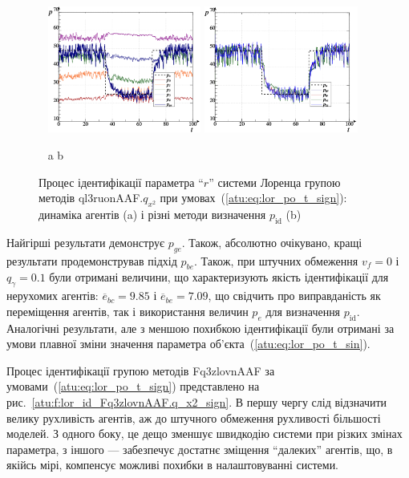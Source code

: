 \documentclass[a4paper,13pt]{atuaref}
\begin{document}
\begin{figure}[ht!]
  \centerline{
    ~ \hfill
    \includegraphics[width=0.45\textwidth]{p5/p/cha/lor/ql3ruonAAF/lor_ql3ruonAAF_qy2-p_t_pi_sign_xl.png}
    \hfill
    \includegraphics[width=0.45\textwidth]{p5/p/cha/lor/ql3ruonAAF/lor_ql3ruonAAF_qy2-p_t_pz_sign_xl.png}
    \hfill ~
  }
  \vspace{-1.5ex}
  \begin{center}
    ~ \hfill a \hfill\hfill b  \hfill ~
  \end{center}
  \vspace{-2.5ex}
  \caption{Процес ідентифікації параметра ``$r$'' системи Лоренца групою методів ql3ruonAAF.$q_{x^2}$ при умовах~(\ref{atu:eq:lor_po_t_sign}):
  динаміка агентів (a) і різні методи визначення $p_\mathrm{id}$ (b)}
  \label{atu:f:lor_id_ql3ruonAAF.q_x2_sign}
\end{figure}

Найгірші результати демонструє $p_{ge}$. Також, абсолютно очікувано, кращі
результати продемонстрував підхід $ p_{be}$. Також, при штучних обмеження
$v_f = 0$ і $q_\gamma = 0.1$ були отримані величини, що характеризують
якість ідентифікації для нерухомих агентів:
$\overline{e}_{bc} = 9.85$ і
$\overline{e}_{be} = 7.09$, що свідчить про виправданість як переміщення
агентів, так і використання величин $p_e$ для визначення $p_\mathrm{id}$.
Аналогічні результати, але з меншою похибкою ідентифікації були отримані за
умови плавної зміни значення параметра об'єкта~(\ref{atu:eq:lor_po_t_sin}).

Процес ідентифікації групою методів Fq3zlovnAAF за умовами~(\ref{atu:eq:lor_po_t_sign}) представлено
на рис.~\ref{atu:f:lor_id_Fq3zlovnAAF.q_x2_sign}. В першу чергу слід
відзначити велику рухливість агентів, аж до штучного обмеження рухливості
більшості моделей. З одного боку, це дещо зменшує швидкодію системи при
різких змінах параметра, з іншого --- забезпечує достатнє зміщення ``далеких''
агентів, що, в якійсь мірі, компенсує можливі похибки в налаштовуванні системи.
\end{document}
